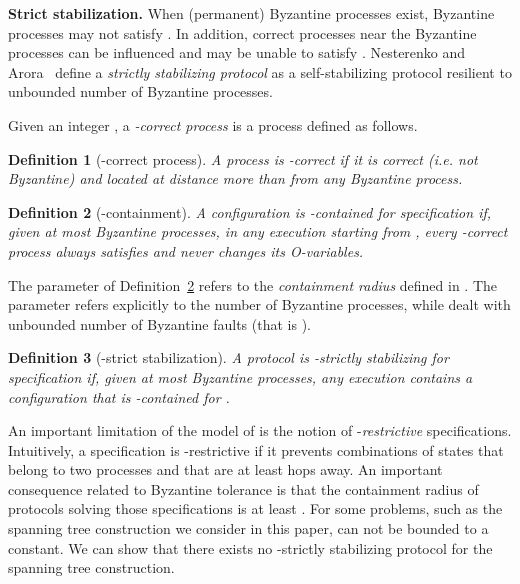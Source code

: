 \documentclass[11pt]{article}
\newtheorem{defi}{Definition}
\newenvironment{definition}[1]{\vspace{-0.25cm}\begin{defi}#1}{\end{defi}\vspace{-0.3cm}}
\begin{document}
\noindent\textbf{Strict stabilization.} When (permanent) Byzantine 
processes exist, Byzantine processes may not satisfy .
In addition, correct processes near the Byzantine processes
can be influenced and may be unable to satisfy .
Nesterenko and Arora~\cite{NA02c} define
a \emph{strictly stabilizing protocol} as a self-stabilizing protocol 
resilient to unbounded number of Byzantine processes.

Given an integer , a \emph{-correct process} is a process 
 defined as follows.

\begin{definition}[-correct process]
A process is -correct if it is correct (\emph{i.e.} not Byzantine) and located at distance more than  from any Byzantine process.
\end{definition}

\begin{definition}[-containment]
\label{def:cfcontained}
A configuration  is \emph{-contained} for specification
 if, given at most  Byzantine processes, in any execution
starting from , every -correct process  always satisfies  and never changes
its O-variables.
\end{definition}

The parameter  of Definition~\ref{def:cfcontained} refers to 
the \emph{containment radius} defined in \cite{NA02c}. 
The parameter  refers explicitly to the number of Byzantine processes, 
while \cite{NA02c} dealt with unbounded number of Byzantine faults 
(that is ).

\begin{definition}[-strict stabilization]
\label{def:cfstabilizing}
A protocol is \emph{-strictly stabilizing} for specification
 if, given at most  Byzantine processes, any execution
 contains a configuration  that
is -contained for .
\end{definition}

An important limitation of the model of \cite{NA02c}
is the notion of -\emph{restrictive} specifications. 
Intuitively, a specification is -restrictive if it prevents 
combinations of states that belong to two processes  and  
that are at least  hops away. 
An important consequence related to Byzantine tolerance is that 
the containment radius of protocols solving those specifications is 
at least . 
For some problems, such as the spanning tree construction we consider
in this paper,  can not be bounded to a constant.
We can show that there exists no -strictly stabilizing
protocol for the spanning tree construction.
\end{document}
